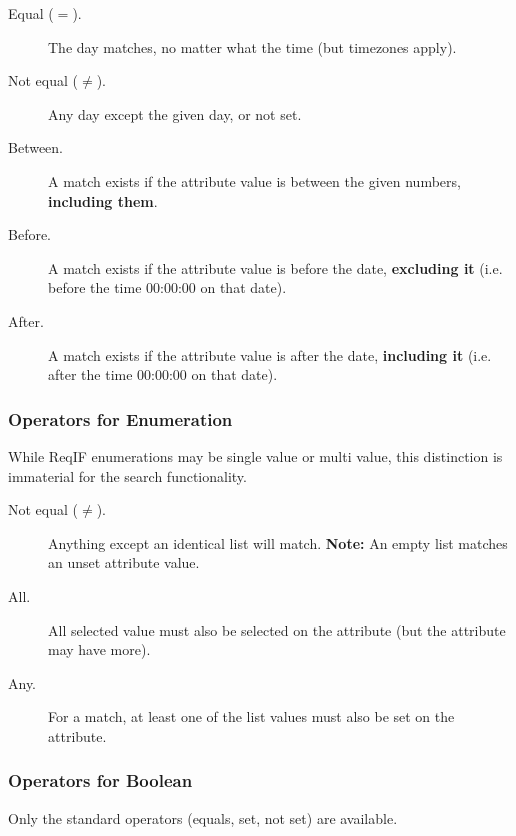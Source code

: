 \begin{description}
\item[Equal ($=$).] The day matches, no matter what the time (but timezones apply).
\item[Not equal ($\neq$).] Any day except the given day, or not set.
\item[Between.] A match exists if the attribute value is between the given numbers, \textbf{including them}.
\item[Before.] A match exists if the attribute value is before the date, \textbf{excluding it} (i.e. before the time 00:00:00 on that date).
\item[After.] A match exists if the attribute value is after the date, \textbf{including it} (i.e. after the time 00:00:00 on that date).
\end{description}

\subsubsection{Operators for Enumeration}

While ReqIF enumerations may be single value or multi value, this distinction is immaterial for the search functionality.

\begin{description}
\item[Not equal ($\neq$).] Anything except an identical list will match.  \textbf{Note:} An empty list matches an unset attribute value.
\item[All.] All selected value must also be selected on the attribute (but the attribute may have more).
\item[Any.] For a match, at least one of the list values must also be set on the attribute.
\end{description}

\subsubsection{Operators for Boolean}

Only the standard operators (equals, set, not set) are available.

